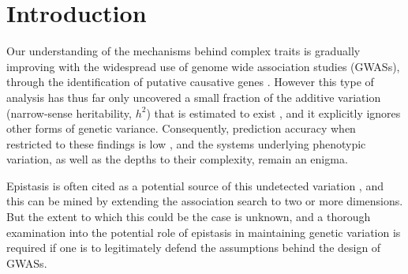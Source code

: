 

\section{Introduction}

Our understanding of the mechanisms behind complex traits is gradually improving with the widespread use of genome wide association studies (GWASs), through the identification of putative causative genes \citep{Hindorff2010}. However this type of analysis has thus far only uncovered a small fraction of the additive variation (narrow-sense heritability, $h^2$) that is estimated to exist \citep{Maher2008}, and it explicitly ignores other forms of genetic variance. Consequently, prediction accuracy when restricted to these findings is low \citep{Purcell2009}, and the systems underlying phenotypic variation, as well as the depths to their complexity, remain an enigma. 

Epistasis is often cited as a potential source of this undetected variation \citep{Manolio2009,Frazer2009}, and this can be mined by extending the association search to two or more dimensions. But the extent to which this could be the case is unknown, and a thorough examination into the potential role of epistasis in maintaining genetic variation is required if one is to legitimately defend the assumptions behind the design of GWASs.

